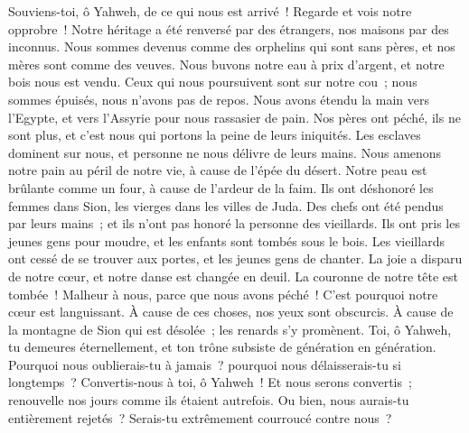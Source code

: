 \begin{multicols}{2}
\VerseOne{}Souviens-toi, ô Yahweh, de ce qui nous est arrivé~! Regarde et vois notre opprobre~!
Notre héritage a été renversé par des étrangers, nos maisons par des inconnus.
Nous sommes devenus comme des orphelins qui sont sans pères, et nos mères sont comme des veuves.
Nous buvons notre eau à prix d'argent, et notre bois nous est vendu.
Ceux qui nous poursuivent sont sur notre cou~; nous sommes épuisés, nous n'avons pas de repos.
Nous avons étendu la main vers l'Egypte, et vers l'Assyrie pour nous rassasier de pain.
Nos pères ont péché, ils ne sont plus, et c'est nous qui portons la peine de leurs iniquités.
Les esclaves dominent sur nous, et personne ne nous délivre de leurs mains.
Nous amenons notre pain au péril de notre vie, à cause de l'épée du désert.
Notre peau est brûlante comme un four, à cause de l'ardeur de la faim.
Ils ont déshonoré les femmes dans Sion, les vierges dans les villes de Juda.
Des chefs ont été pendus par leurs mains~; et ils n'ont pas honoré la personne des vieillards.
Ils ont pris les jeunes gens pour moudre, et les enfants sont tombés sous le bois.
Les vieillards ont cessé de se trouver aux portes, et les jeunes gens de chanter.
La joie a disparu de notre cœur, et notre danse est changée en deuil.
La couronne de notre tête est tombée~! Malheur à nous, parce que nous avons péché~!
C'est pourquoi notre cœur est languissant. À cause de ces choses, nos yeux sont obscurcis.
À cause de la montagne de Sion qui est désolée~; les renards s'y promènent.
Toi, ô Yahweh, tu demeures éternellement, et ton trône subsiste de génération en génération.
Pourquoi nous oublierais-tu à jamais~? pourquoi nous délaisserais-tu si longtemps~?
Convertis-nous à toi, ô Yahweh~! Et nous serons convertis~; renouvelle nos jours comme ils étaient autrefois.
Ou bien, nous aurais-tu entièrement rejetés~? Serais-tu extrêmement courroucé contre nous~?
\PPE{}
\end{multicols}

